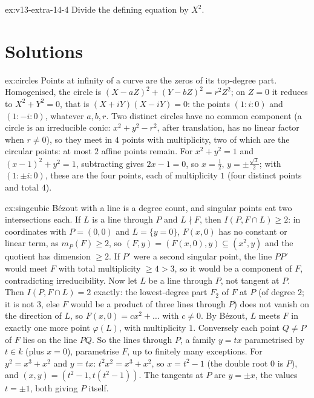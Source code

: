 \begin{hint}{ex:v13-extra-14-4}
Divide the defining equation by $X^2$.
\end{hint}

\section{Solutions}

\begin{solution}{ex:circles}
\idea Points at infinity of a curve are the zeros of its top-degree part.
\writeup Homogenised, the circle is $(X-aZ)^2+(Y-bZ)^2=r^2Z^2$; on $Z=0$ it reduces to $X^2+Y^2=0$, that is $(X+iY)(X-iY)=0$: the points $(1:i:0)$ and
$(1:-i:0)$, whatever $a,b,r$. Two distinct circles have no common component (a circle is an irreducible conic: $x^2+y^2-r^2$, after translation, has no
linear factor when $r\ne0$), so they meet in $4$ points with multiplicity, two of which are the circular points: at most $2$ affine points remain. For
$x^2+y^2=1$ and $(x-1)^2+y^2=1$, subtracting gives $2x-1=0$, so $x=\frac12$, $y=\pm\frac{\sqrt3}2$; with $(1:\pm i:0)$, these are the four points, each of
multiplicity $1$ (four distinct points and total $4$).
\end{solution}

\begin{solution}{ex:singcubic}
\idea Bézout with a line is a degree count, and singular points eat two intersections each.
\writeup If $L$ is a line through $P$ and $L\nmid F$, then $I(P,F\cap L)\ge2$: in coordinates with $P=(0,0)$ and $L=\{y=0\}$, $F(x,0)$ has no constant or
linear term, as $m_P(F)\ge2$, so $(F,y)=(F(x,0),y)\subseteq(x^2,y)$ and the quotient has dimension $\ge2$. If $P'$ were a second singular point, the line
$PP'$ would meet $F$ with total multiplicity $\ge4>3$, so it would be a component of $F$, contradicting irreducibility. Now let $L$ be a line through $P$,
not tangent at $P$. Then $I(P,F\cap L)=2$ exactly: the lowest-degree part $F_2$ of $F$ at $P$ (of degree $2$; it is not $3$, else $F$ would be a product of
three lines through $P$) does not vanish on the direction of $L$, so $F(x,0)=cx^2+\dots$ with $c\ne0$. By B\'ezout, $L$ meets $F$ in exactly one more point
$\varphi(L)$, with multiplicity $1$. Conversely each point $Q\ne P$ of $F$ lies on the line $PQ$. So the lines through $P$, a family $y=tx$
parametrised by $t\in k$ (plus $x=0$), parametrise $F$, up to finitely many exceptions. For $y^2=x^3+x^2$ and $y=tx$: $t^2x^2=x^3+x^2$, so $x=t^2-1$
(the double root $0$ is $P$), and $(x,y)=(t^2-1,t(t^2-1))$. The tangents at $P$ are $y=\pm x$, the values $t=\pm1$, both giving $P$ itself.
\end{solution}

